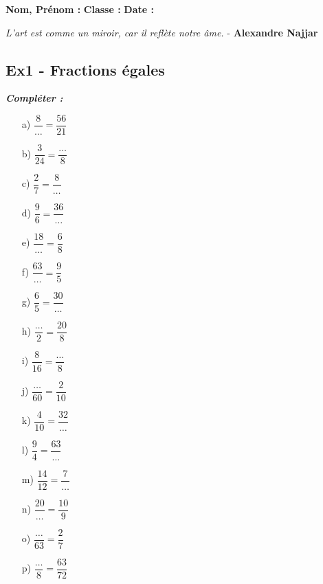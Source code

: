 \documentclass[11pt]{article}
\begin{document}
\newpage

\textbf{Nom, Prénom :} \hspace{8cm} \textbf{Classe :} \hspace{3cm} \textbf{Date :}\\

\begin{center}
  \textit{L'art est comme un miroir, car il reflète notre âme.}  - \textbf{Alexandre Najjar}
\end{center}

\subsection*{Ex1 - Fractions égales}

\textit{\textbf{Compléter :}}

\begin{multicols}{4}

  \begin{enumerate}
    \item[a)] $\dfrac{8}{\ldots}=\dfrac{56}{21}$
    \item[b)] $\dfrac{3}{24}=\dfrac{\ldots}{8}$
    \item[c)] $\dfrac{2}{7}=\dfrac{8}{\ldots}$
    \item[d)] $\dfrac{9}{6}=\dfrac{36}{\ldots}$
    \item[e)] $\dfrac{18}{\ldots}=\dfrac{6}{8}$
    \item[f)] $\dfrac{63}{\ldots}=\dfrac{9}{5}$
    \item[g)] $\dfrac{6}{5}=\dfrac{30}{\ldots}$
    \item[h)] $\dfrac{\ldots}{2}=\dfrac{20}{8}$
    \item[i)] $\dfrac{8}{16}=\dfrac{\ldots}{8}$
    \item[j)] $\dfrac{\ldots}{60}=\dfrac{2}{10}$
    \item[k)] $\dfrac{4}{10}=\dfrac{32}{\ldots}$
    \item[l)] $\dfrac{9}{4}=\dfrac{63}{\ldots}$
    \item[m)] $\dfrac{14}{12}=\dfrac{7}{\ldots}$
    \item[n)] $\dfrac{20}{\ldots}=\dfrac{10}{9}$
    \item[o)] $\dfrac{\ldots}{63}=\dfrac{2}{7}$
    \item[p)] $\dfrac{\ldots}{8}=\dfrac{63}{72}$
  \end{enumerate}

\end{multicols}
\end{document}
